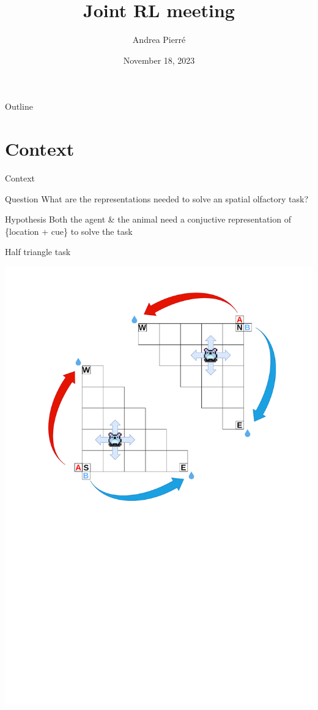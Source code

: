 \documentclass[bigger]{beamer}
\author{Andrea Pierré}
\date{November 18, 2023}
\title{Joint RL meeting}
\institute{Brown University}
\begin{document}
\maketitle
\begin{frame}[plain]{Outline}
\tableofcontents
\end{frame}

\section{Context}
\label{sec:org3d9e5ff}
\begin{frame}[label={sec:org71b2c60}]{Context}
\begin{exampleblock}{Question}
    What are the representations needed to solve an spatial olfactory task?
\end{exampleblock}
\vspace{2em}
\begin{exampleblock}{Hypothesis}
    Both the agent \& the animal need a conjuctive representation of \{location + cue\} to solve the task
\end{exampleblock}
\end{frame}
\begin{frame}[label={sec:orgb6724de}]{Half triangle task}
\begin{center}
\includegraphics[width=.9\linewidth]{img/RL_env-triangle-task.drawio.pdf}
\end{center}
\end{frame}
\end{document}
